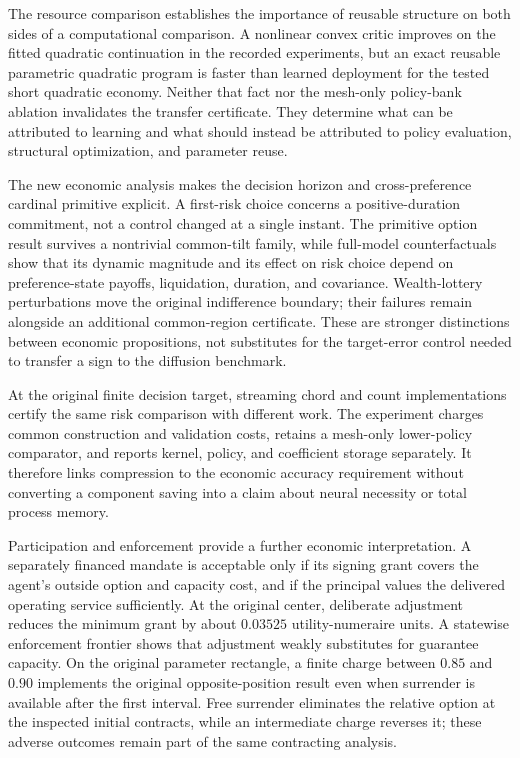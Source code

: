 The resource comparison establishes the importance of reusable structure on both sides of a computational comparison. A nonlinear convex critic improves on the fitted quadratic continuation in the recorded experiments, but an exact reusable parametric quadratic program is faster than learned deployment for the tested short quadratic economy. Neither that fact nor the mesh-only policy-bank ablation invalidates the transfer certificate. They determine what can be attributed to learning and what should instead be attributed to policy evaluation, structural optimization, and parameter reuse.

The new economic analysis makes the decision horizon and cross-preference cardinal primitive explicit. A first-risk choice concerns a positive-duration commitment, not a control changed at a single instant. The primitive option result survives a nontrivial common-tilt family, while full-model counterfactuals show that its dynamic magnitude and its effect on risk choice depend on preference-state payoffs, liquidation, duration, and covariance. Wealth-lottery perturbations move the original indifference boundary; their failures remain alongside an additional common-region certificate. These are stronger distinctions between economic propositions, not substitutes for the target-error control needed to transfer a sign to the diffusion benchmark.

At the original finite decision target, streaming chord and count implementations certify the same risk comparison with different work. The experiment charges common construction and validation costs, retains a mesh-only lower-policy comparator, and reports kernel, policy, and coefficient storage separately. It therefore links compression to the economic accuracy requirement without converting a component saving into a claim about neural necessity or total process memory.

Participation and enforcement provide a further economic interpretation. A separately financed mandate is acceptable only if its signing grant covers the agent's outside option and capacity cost, and if the principal values the delivered operating service sufficiently. At the original center, deliberate adjustment reduces the minimum grant by about $0.03525$ utility-numeraire units. A statewise enforcement frontier shows that adjustment weakly substitutes for guarantee capacity. On the original parameter rectangle, a finite charge between $0.85$ and $0.90$ implements the original opposite-position result even when surrender is available after the first interval. Free surrender eliminates the relative option at the inspected initial contracts, while an intermediate charge reverses it; these adverse outcomes remain part of the same contracting analysis.

